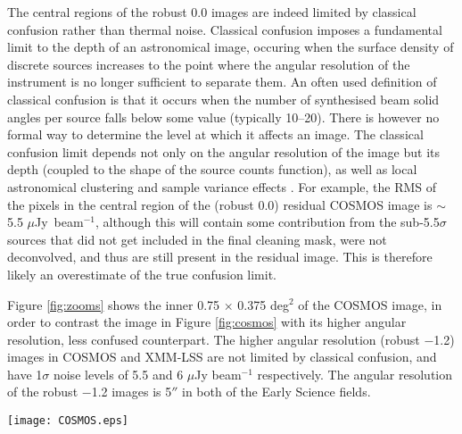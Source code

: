 \documentclass[usenatbib,usedcolumn]{mnras}
\begin{document}
The central regions of the robust 0.0 images are indeed limited by classical confusion rather than thermal noise. Classical confusion imposes a fundamental limit to the depth of an astronomical image, occuring when the surface density of discrete sources increases to the point where the angular resolution of the instrument is no longer sufficient to separate them. An often used definition of classical confusion is that it occurs when the number of synthesised beam solid angles per source falls below some value (typically 10--20). There is however no formal way to determine the level at which it affects an image. The classical confusion limit depends not only on the angular resolution of the image but its depth (coupled to the shape of the source counts function), as well as local astronomical clustering and sample variance effects \citep{heywood2013}.
For example, the RMS of the pixels in the central region of the (robust 0.0) residual COSMOS image is $\sim$5.5 $\mu$Jy~beam$^{-1}$, although this will contain some contribution from the sub-5.5$\sigma$ sources that did not get included in the final cleaning mask, were not deconvolved, and thus are still present in the residual image. This is therefore likely an overestimate of the true confusion limit.

Figure \ref{fig:zooms} shows the inner 0.75 $\times$ 0.375 deg$^{2}$ of the COSMOS image, in order to contrast the image in Figure \ref{fig:cosmos} with its higher angular resolution, less confused counterpart. The higher angular resolution (robust $-$1.2) images in COSMOS and XMM-LSS are not limited by classical confusion, and have 1$\sigma$ noise levels of 5.5 and 6 $\mu$Jy beam$^{-1}$ respectively. The angular resolution of the robust $-$1.2 images is 5$''$ in both of the Early Science fields.

\begin{figure*}
\centering
\texttt{[image: COSMOS.eps]}
\caption{The MIGHTEE COSMOS Early Science image. The angular resolution is 8$''$.6, and while the thermal noise in the data is 1.7 $\mu$Jy beam$^{-1}$ this map is limited by classical confusion at approximately 4.5 $\mu$Jy beam$^{-1}$. The image covers 1.6 deg$^{2}$ and contains almost 10,000 radio components with peak brightnesses exceeding 5$\sigma_{\mathrm{local}}$ (see Section \ref{sec:catalogues} for details). The pair of giant radio galaxies reported by \citet{delhaize2021} are visible towards the top and in the lower third of the image.}
\label{fig:cosmos}
\end{figure*}
\end{document}

